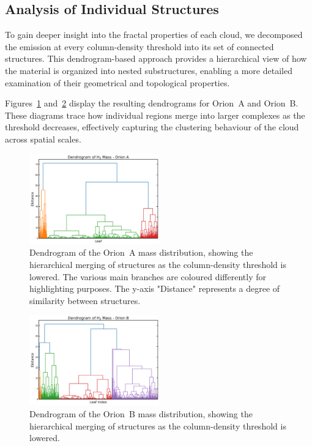 \subsection{Analysis of Individual Structures}

To gain deeper insight into the fractal properties of each cloud, we decomposed the emission at every column-density threshold into its set of connected structures. This dendrogram-based approach provides a hierarchical view of how the material is organized into nested substructures, enabling a more detailed examination of their geometrical and topological properties.

Figures~\ref{fig:dendrogram_A} and~\ref{fig:dendrogram_B} display the resulting dendrograms for Orion~A and Orion~B. These diagrams trace how individual regions merge into larger complexes as the threshold decreases, effectively capturing the clustering behaviour of the cloud across spatial scales.

\begin{figure}[t]
    \centering
    \includegraphics[width=0.5\textwidth]{figures/dendogram_A.png}
    \caption{Dendrogram of the Orion~A mass distribution, showing the hierarchical merging of structures as the column-density threshold is lowered. The various main branches are coloured differently for highlighting purposes. The y-axis "Distance" represents a degree of similarity between structures. }
    \label{fig:dendrogram_A}
\end{figure}

\begin{figure}[t]
    \centering
    \includegraphics[width=0.5\textwidth]{figures/dendogram_B.png}
    \caption{Dendrogram of the Orion~B mass distribution, showing the hierarchical merging of structures as the column-density threshold is lowered.}
    \label{fig:dendrogram_B}
\end{figure}

